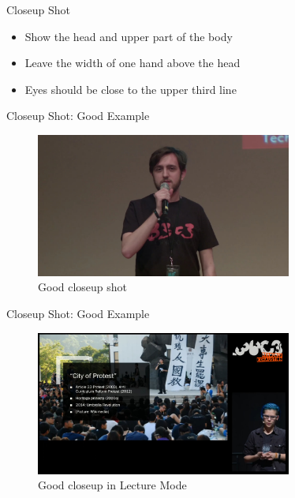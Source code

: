 
\begin{frame}{Closeup Shot}
	\begin{itemize}
		\item Show the head and upper part of the body
		\item Leave the width of one hand above the head
		\item Eyes should be close to the upper third line
	\end{itemize}
\end{frame}

\begin{frame}{Closeup Shot: Good Example}
	\begin{figure}
		\centering
		\includegraphics[width=0.75\textwidth]{images/shot-closeup1.jpg}
		\caption{Good closeup shot}
	\end{figure}
\end{frame}

\begin{frame}{Closeup Shot: Good Example}
	\begin{figure}
		\centering
		\includegraphics[width=0.75\textwidth]{images/shot-closeup2.jpg}
		\caption{Good closeup in Lecture Mode}
	\end{figure}
\end{frame}

